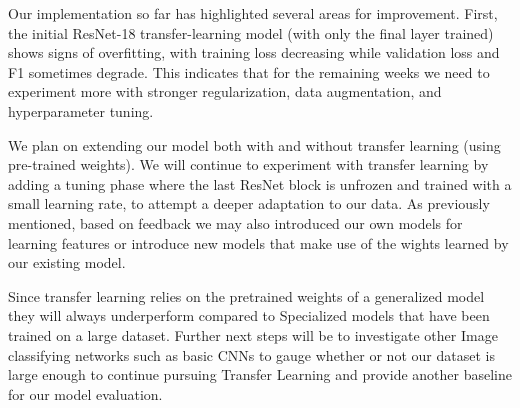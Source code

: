 \documentclass[11pt]{article}
\begin{document}
Our implementation so far has highlighted several areas for improvement. First, the initial ResNet-18 transfer-learning model (with only the final layer trained) shows signs of overfitting, with training loss decreasing while validation loss and F1 sometimes degrade. This indicates that for the remaining weeks we need to experiment more with stronger regularization, data augmentation, and hyperparameter tuning.

We plan on extending our model both with and without transfer learning (using pre-trained weights). We will continue to experiment with transfer learning by adding a tuning phase where the last ResNet block is unfrozen and trained with a small learning rate, to attempt a deeper adaptation to our data. As previously mentioned, based on feedback we may also introduced our own models for learning features or introduce new models that make use of the wights learned by our existing model.

Since transfer learning relies on the pretrained weights of a generalized model they will always underperform compared to Specialized models that have been trained on a large dataset. Further next steps will be to investigate other Image classifying networks such as basic CNNs to gauge whether or not our dataset is large enough to continue pursuing Transfer Learning and provide another baseline for our model evaluation. 







\end{document}
